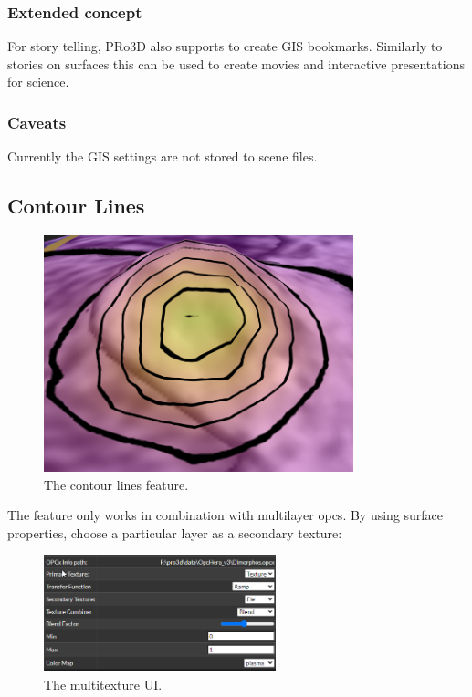 \hypertarget{extended-concept}{%
	\subsubsection{Extended concept}\label{extended-concept}}

For story telling, PRo3D also supports to create GIS bookmarks.
Similarly to stories on surfaces this can be used to create movies and
interactive presentations for science.

\hypertarget{caveats}{%
	\subsubsection{Caveats}\label{caveats}}

Currently the GIS settings are not stored to scene files.

\newpage
\subsection{Contour Lines}
\label{sec:contourLines}

\begin{figure}[h!]
	\centering
	\includegraphics[width=0.8\textwidth]{pics/contourTeaser.png}
	\caption{The contour lines feature.}
\end{figure}

The feature only works in combination with multilayer opcs. By using surface properties, choose a particular layer as a secondary texture:

\begin{figure}[h!]
	\centering
	\includegraphics[width=0.6\textwidth]{pics/multitexture-ui.png}
	\caption{The multitexture UI.}
\end{figure}

